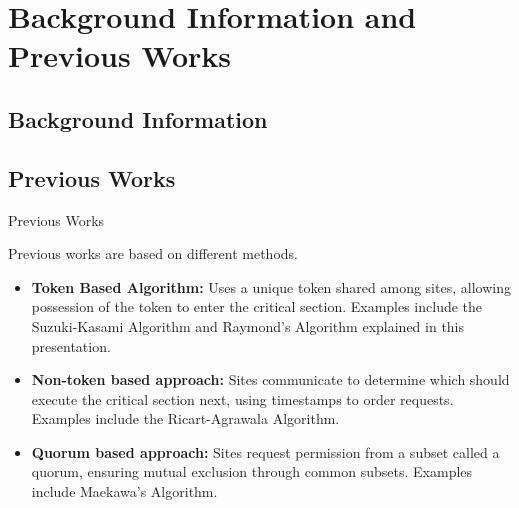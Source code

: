 \documentclass[11pt]{beamer}              %
\begin{document}
\section{Background Information and Previous Works}


\subsection{Background Information}


\subsection{Previous Works}
\begin{frame}{Previous Works}

Previous works are based on different methods.

\begin{itemize}
    \item \textbf{Token Based Algorithm:} Uses a unique token shared among sites, allowing possession of the token to enter the critical section. Examples include the Suzuki-Kasami Algorithm and Raymond’s Algorithm explained in this presentation.
    \item \textbf{Non-token based approach:} Sites communicate to determine which should execute the critical section next, using timestamps to order requests. Examples include the Ricart-Agrawala Algorithm.
    \item \textbf{Quorum based approach:} Sites request permission from a subset called a quorum, ensuring mutual exclusion through common subsets. Examples include Maekawa’s Algorithm.
\end{itemize}

\end{frame}
\end{document}

